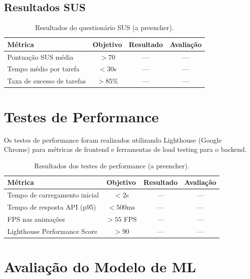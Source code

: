 \subsection{Resultados SUS}

\begin{table}[H]
\centering
\caption{Resultados do questionário SUS (a preencher).}
\label{tab:sus-results}
\begin{tabularx}{\textwidth}{l c c c}
\toprule
\textbf{Métrica} & \textbf{Objetivo} & \textbf{Resultado} & \textbf{Avaliação} \\
\midrule
Pontuação SUS média & $> 70$ & --- & --- \\
Tempo médio por tarefa & $< 30$s & --- & --- \\
Taxa de sucesso de tarefas & $> 85\%$ & --- & --- \\
\bottomrule
\end{tabularx}
\end{table}


\section{Testes de Performance}
\label{sec:test-performance}

Os testes de performance foram realizados utilizando Lighthouse (Google Chrome) para métricas de frontend e ferramentas de load testing para o backend.

\begin{table}[H]
\centering
\caption{Resultados dos testes de performance (a preencher).}
\label{tab:perf-results}
\begin{tabularx}{\textwidth}{l c c c}
\toprule
\textbf{Métrica} & \textbf{Objetivo} & \textbf{Resultado} & \textbf{Avaliação} \\
\midrule
Tempo de carregamento inicial & $< 2$s & --- & --- \\
Tempo de resposta \ac{API} (p95) & $< 500$ms & --- & --- \\
FPS nas animações & $> 55$ FPS & --- & --- \\
Lighthouse Performance Score & $> 90$ & --- & --- \\
\bottomrule
\end{tabularx}
\end{table}


\section{Avaliação do Modelo de ML}
\label{sec:test-ml}

